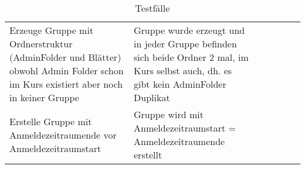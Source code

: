 \begin{table}[]
	\centering
	\caption{Testfälle}
	\label{my-label}
	\begin{tabular}{p{6cm}p{7cm}p{3cm}llll}
		Erzeuge Gruppe mit Ordnerstruktur (AdminFolder und Blätter)  obwohl Admin Folder schon im Kurs existiert aber noch in keiner Gruppe  & Gruppe wurde erzeugt und in jeder Gruppe befinden sich beide Ordner 2 mal, im Kurs selbst auch, dh. es gibt kein AdminFolder Duplikat                            & \checkmark           &  &  &  \\
		Erstelle Gruppe mit Anmeldezeitraumende vor Anmeldezeitraumstart                                                                     & Gruppe wird mit Anmeldezeitraumstart = Anmeldezeitraumende erstellt                                                                                              & \checkmark           &  &  &  \\


\end{tabular}
\end{table}

